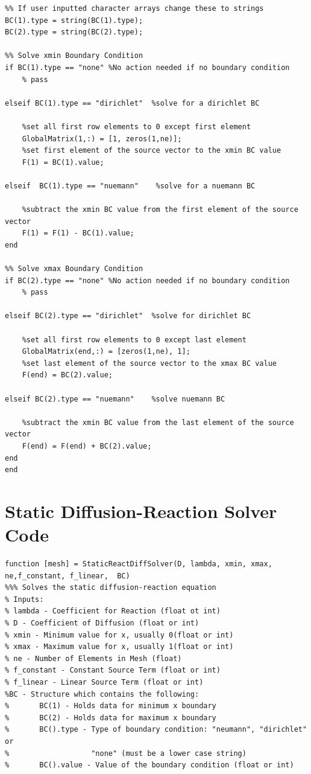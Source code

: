 \documentclass[11pt]{article}
\begin{document}
\begin{appendices}
\begin{lstlisting}
%% If user inputted character arrays change these to strings
BC(1).type = string(BC(1).type);
BC(2).type = string(BC(2).type);

%% Solve xmin Boundary Condition 
if BC(1).type == "none" %No action needed if no boundary condition
    % pass 
    
elseif BC(1).type == "dirichlet"  %solve for a dirichlet BC
    
    %set all first row elements to 0 except first element  
    GlobalMatrix(1,:) = [1, zeros(1,ne)];   
    %set first element of the source vector to the xmin BC value
    F(1) = BC(1).value;
    
elseif  BC(1).type == "nuemann"    %solve for a nuemann BC
    
    %subtract the xmin BC value from the first element of the source vector 
    F(1) = F(1) - BC(1).value;
end

%% Solve xmax Boundary Condition
if BC(2).type == "none" %No action needed if no boundary condition
    % pass
    
elseif BC(2).type == "dirichlet"  %solve for dirichlet BC
    
    %set all first row elements to 0 except last element 
    GlobalMatrix(end,:) = [zeros(1,ne), 1];
    %set last element of the source vector to the xmax BC value
    F(end) = BC(2).value;
    
elseif BC(2).type == "nuemann"    %solve nuemann BC
    
    %subtract the xmin BC value from the last element of the source vector 
    F(end) = F(end) + BC(2).value;
end   
end
\end{lstlisting}
\pagebreak



\section{Static Diffusion-Reaction Solver Code}
\label{ap:SDRS}
\begin{lstlisting}
function [mesh] = StaticReactDiffSolver(D, lambda, xmin, xmax, ne,f_constant, f_linear,  BC)
%%% Solves the static diffusion-reaction equation
% Inputs:
% lambda - Coefficient for Reaction (float ot int)
% D - Coefficient of Diffusion (float or int)
% xmin - Minimum value for x, usually 0(float or int)
% xmax - Maximum value for x, usually 1(float or int)
% ne - Number of Elements in Mesh (float)
% f_constant - Constant Source Term (float or int)
% f_linear - Linear Source Term (float or int)
%BC - Structure which contains the following:
%       BC(1) - Holds data for minimum x boundary
%       BC(2) - Holds data for maximum x boundary
%       BC().type - Type of boundary condition: "neumann", "dirichlet" or
%                   "none" (must be a lower case string)
%       BC().value - Value of the boundary condition (float or int)


\end{lstlisting}
\end{appendices}
\end{document}
